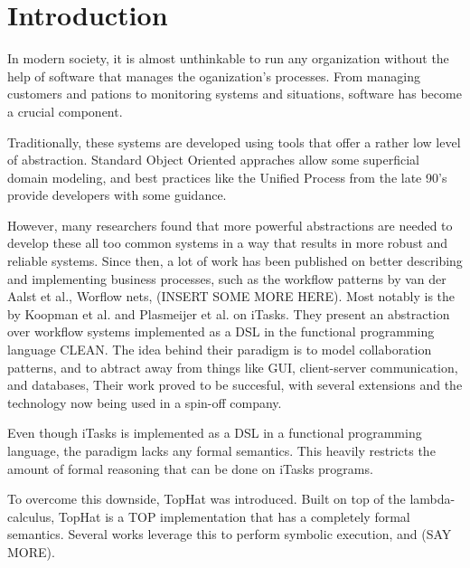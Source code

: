 
\section{Introduction}

In modern society, it is almost unthinkable to run any organization without the help of software that manages the oganization's processes.
From managing customers and pations to monitoring systems and situations, software has become a crucial component.

Traditionally, these systems are developed using tools that offer a rather low level of abstraction.
Standard Object Oriented appraches allow some superficial domain modeling, and best practices like the Unified Process from the late 90's provide developers with some guidance.

However, many researchers found that more powerful abstractions are needed to develop these all too common systems in a way that results in more robust and reliable systems.
Since then, a lot of work has been published on better describing and implementing business processes, such as the workflow patterns by van der Aalst et al., Worflow nets, (INSERT SOME MORE HERE).
Most notably is the by Koopman et al. and Plasmeijer et al. on iTasks.
They present an abstraction over workflow systems implemented as a DSL in the functional programming language CLEAN.
The idea behind their paradigm is to model collaboration patterns, and to abtract away from things like GUI, client-server communication, and databases, 
Their work proved to be succesful, with several extensions and the technology now being used in a spin-off company.

Even though iTasks is implemented as a DSL in a functional programming language, the paradigm lacks any formal semantics.
This heavily restricts the amount of formal reasoning that can be done on iTasks programs.

To overcome this downside, TopHat was introduced.
Built on top of the lambda-calculus, TopHat is a TOP implementation that has a completely formal semantics.
Several works leverage this to perform symbolic execution, and (SAY MORE).
